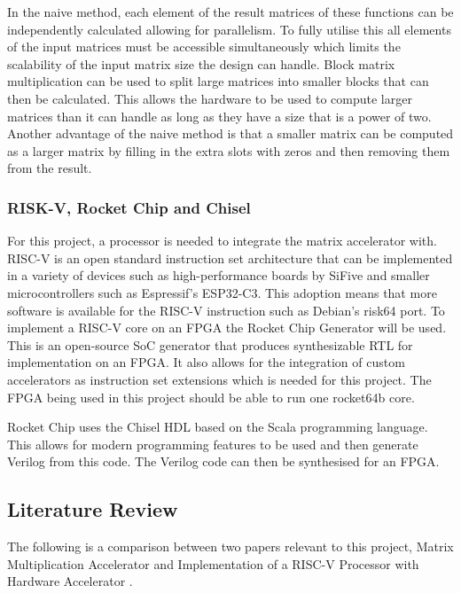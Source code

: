 In the naive method, each element of the result matrices of these functions can be independently calculated allowing for parallelism. To fully utilise this all elements of the input matrices must be accessible simultaneously which limits the scalability of the input matrix size the design can handle. Block matrix multiplication can be used to split large matrices into smaller blocks that can then be calculated. This allows the hardware to be used to compute larger matrices than it can handle as long as they have a size that is a power of two. Another advantage of the naive method is that a smaller matrix can be computed as a larger matrix by filling in the extra slots with zeros and then removing them from the result.

\subsubsection{RISK-V, Rocket Chip and Chisel}
For this project, a processor is needed to integrate the matrix accelerator with. RISC-V is an open standard instruction set architecture that can be implemented in a variety of devices such as high-performance boards by SiFive and smaller microcontrollers such as Espressif's ESP32-C3. This adoption means that more software is available for the RISC-V instruction such as Debian's risk64 port. To implement a RISC-V core on an FPGA the Rocket Chip Generator will be used. This is an open-source SoC generator that produces synthesizable RTL for implementation on an FPGA. It also allows for the integration of custom accelerators as instruction set extensions \cite{rocketchip} which is needed for this project. The FPGA being used in this project should be able to run one rocket64b core.

Rocket Chip uses the Chisel HDL based on the Scala programming language. This allows for modern programming features to be used and then generate Verilog from this code. The Verilog code can then be synthesised for an FPGA.

\subsection{Literature Review}
The following is a comparison between two papers relevant to this project, Matrix Multiplication Accelerator \cite{matrix_mult_accel} and Implementation of a RISC-V Processor with Hardware Accelerator \cite{risc-v_hard_accel}.

